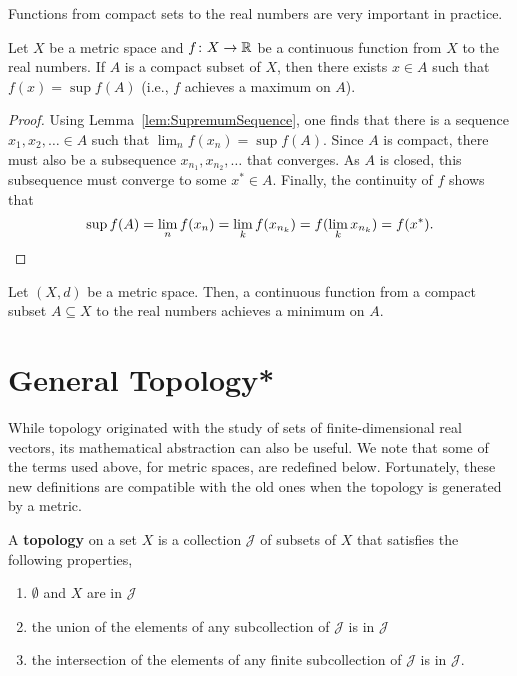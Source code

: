 Functions from compact sets to the real numbers are very important in practice.

\begin{theorem}
Let $X$ be a metric space and $f \colon X\rightarrow \mathbb{R}$ be a continuous function from $X$ to the real numbers.
If $A$ is a compact subset of $X$, then there exists $x\in A$ such that $f(x)=\sup f(A)$ (i.e., $f$ achieves a maximum on $A$).
\end{theorem}
\begin{proof}
Using Lemma~\ref{lem:SupremumSequence}, one finds that there is a sequence $x_1,x_2,\ldots \in A$ such that $\lim_n f(x_n) = \sup f(A)$.
Since $A$ is compact, there must also be a subsequence $x_{n_1},x_{n_2},\ldots$ that converges.
As $A$ is closed, this subsequence must converge to some $x^* \in A$.
Finally, the continuity of $f$ shows that
\[\sup f(A) = \lim_n f(x_n) = \lim_k f(x_{n_k}) = f(\lim_k x_{n_k}) = f(x^*). \qedhere \]
\end{proof}

\begin{corollary}
Let $(X,d)$ be a metric space.
Then, a continuous function from a compact subset $A\subseteq X$ to the real numbers achieves a minimum on $A$.
\end{corollary}



\section{General Topology*}

While topology originated with the study of sets of finite-dimensional real vectors, its mathematical abstraction can also be useful.
We note that some of the terms used above, for metric spaces, are redefined below.
Fortunately, these new definitions are compatible with the old ones when the topology is generated by a metric.

\begin{definition}
A \textbf{topology} on a set $X$ is a collection $\mathcal{J}$ of subsets of $X$ that satisfies the following properties,
\begin{enumerate}
\item $\emptyset$ and $X$ are in $\mathcal{J}$
\item the union of the elements of any subcollection of $\mathcal{J}$ is in $\mathcal{J}$
\item the intersection of the elements of any finite subcollection of $\mathcal{J}$ is in $\mathcal{J}$.
\end{enumerate}
\end{definition}

